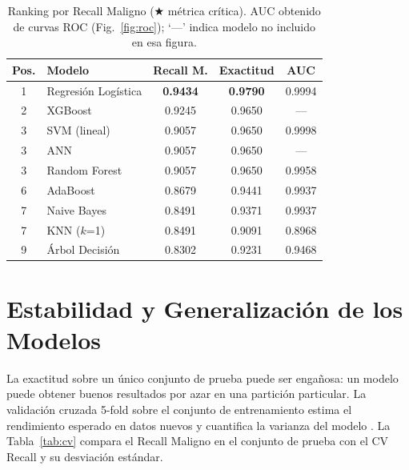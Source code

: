 \documentclass[journal]{IEEEtran}
\begin{document}
\begin{table}[!t]
\centering
\caption{Ranking por Recall Maligno ($\bigstar$ métrica crítica). AUC obtenido de curvas ROC (Fig.~\ref{fig:roc}); `---' indica modelo no incluido en esa figura.}
\label{tab:ranking}
\renewcommand{\arraystretch}{1.2}
\begin{tabular}{clccc}
\toprule
\textbf{Pos.} & \textbf{Modelo} & \textbf{Recall M.} & \textbf{Exactitud} & \textbf{AUC} \\
\midrule
1 & Regresión Logística & \cellcolor{verdemejor}\textbf{0.9434} & \textbf{0.9790} & 0.9994 \\
2 & XGBoost             & 0.9245 & 0.9650 & ---    \\
3 & SVM (lineal)        & 0.9057 & 0.9650 & \cellcolor{verdemejor}0.9998 \\
3 & ANN                 & 0.9057 & 0.9650 & ---    \\
3 & Random Forest       & 0.9057 & 0.9650 & 0.9958 \\
6 & AdaBoost            & 0.8679 & 0.9441 & 0.9937 \\
7 & Naive Bayes         & 0.8491 & 0.9371 & 0.9937 \\
7 & KNN ($k$=1)         & 0.8491 & 0.9091 & 0.8968 \\
9 & Árbol Decisión      & \cellcolor{rojomenor}0.8302 & 0.9231 & 0.9468 \\
\bottomrule
\end{tabular}
\end{table}

\section{Estabilidad y Generalización de los Modelos}

La exactitud sobre un único conjunto de prueba puede ser
engañosa: un modelo puede obtener buenos resultados por azar
en una partición particular. La validación cruzada 5-fold
sobre el conjunto de entrenamiento estima el rendimiento
esperado en datos nuevos y cuantifica la varianza del modelo \cite{hastie2009}.
La Tabla~\ref{tab:cv} compara el Recall Maligno en el conjunto
de prueba con el CV Recall y su desviación estándar.
\end{document}
